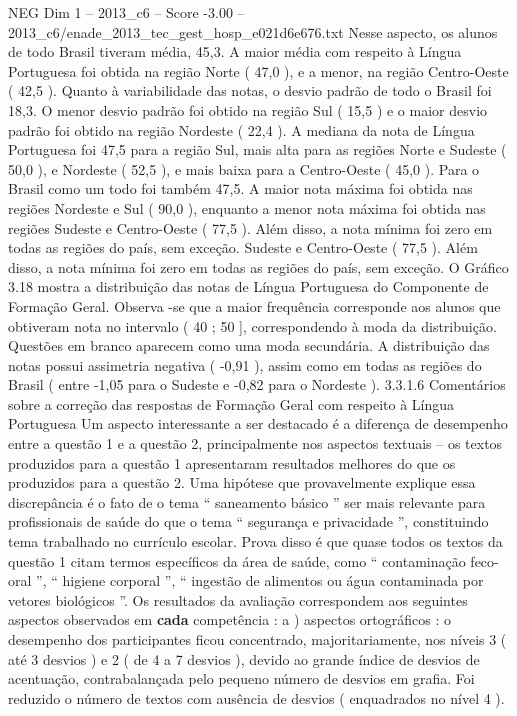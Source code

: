 \begin{textsample}{NEG Dim 1 – 2013\_c6 – Score -3.00 – 2013\_c6/enade\_2013\_tec\_gest\_hosp\_e021d6e676.txt}
Nesse aspecto, os alunos de todo Brasil tiveram média, 45,3.
A maior média com respeito à Língua Portuguesa foi obtida na região Norte ( 47,0 ), e a menor, na região Centro-Oeste ( 42,5 ).
Quanto à variabilidade das notas, o desvio padrão de todo o Brasil foi 18,3.
O menor desvio padrão foi obtido na região Sul ( 15,5 ) e o maior desvio padrão foi obtido na região Nordeste ( 22,4 ).
A mediana da nota de Língua Portuguesa foi 47,5 para a região Sul, mais alta para as regiões Norte e Sudeste ( 50,0 ), e Nordeste ( 52,5 ), e mais baixa para a Centro-Oeste ( 45,0 ).
Para o Brasil como um todo foi também 47,5.
A maior nota máxima foi obtida nas regiões Nordeste e Sul ( 90,0 ), enquanto a menor nota máxima foi obtida nas regiões Sudeste e Centro-Oeste ( 77,5 ).
Além disso, a nota mínima foi zero em todas as regiões do país, sem exceção.
Sudeste e Centro-Oeste ( 77,5 ).
Além disso, a nota mínima foi zero em todas as regiões do país, sem exceção.
O Gráfico 3.18 mostra a distribuição das notas de Língua Portuguesa do Componente de Formação Geral.
Observa -se que a maior frequência corresponde aos alunos que obtiveram nota no intervalo ( 40 ; 50 ], correspondendo à moda da distribuição.
Questões em branco aparecem como uma moda secundária.
A distribuição das notas possui assimetria negativa ( -0,91 ), assim como em todas as regiões do Brasil ( entre -1,05 para o Sudeste e -0,82 para o Nordeste ). 3.3.1.6 Comentários sobre a correção das respostas de Formação Geral com respeito à Língua Portuguesa Um aspecto interessante a ser destacado é a diferença de desempenho entre a questão 1 e a questão 2, principalmente nos aspectos textuais – os textos produzidos para a questão 1 apresentaram resultados melhores do que os produzidos para a questão 2.
Uma hipótese que provavelmente explique essa discrepância é o fato de o tema “ saneamento básico ” ser mais relevante para profissionais de saúde do que o tema “ segurança e privacidade ”, constituindo tema trabalhado no currículo escolar.
Prova disso é que quase todos os textos da questão 1 citam termos específicos da área de saúde, como “ contaminação feco-oral ”, “ higiene corporal ”, “ ingestão de alimentos ou água contaminada por vetores biológicos ”.
Os resultados da avaliação correspondem aos seguintes aspectos observados em \textbf{cada} competência : a ) aspectos ortográficos : o desempenho dos participantes ficou concentrado, majoritariamente, nos níveis 3 ( até 3 desvios ) e 2 ( de 4 a 7 desvios ), devido ao grande índice de desvios de acentuação, contrabalançada pelo pequeno número de desvios em grafia.
Foi reduzido o número de textos com ausência de desvios ( enquadrados no nível 4 ).

\end{textsample}
